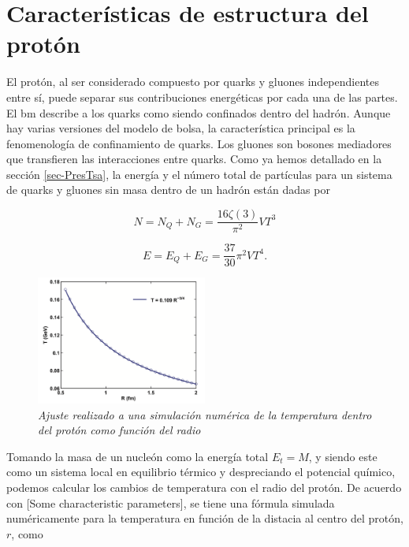 \chapter{Características de estructura del protón}\label{ch-ProtonStructureCh}

El protón, al ser considerado compuesto por quarks y gluones independientes entre sí, puede separar sus contribuciones energéticas por cada una de las partes. El \acrshort{bm} describe a los quarks como siendo confinados dentro del hadrón. Aunque hay varias versiones del modelo de bolsa, la característica principal es la fenomenología de confinamiento de quarks. Los gluones son bosones mediadores que transfieren las interacciones entre quarks. Como ya hemos detallado en la sección \ref{sec-PresTsa}, la energía y el número total de partículas para un sistema de quarks y gluones sin masa dentro de un hadrón están dadas por

\begin{equation}
N ={N}_{Q} + {N}_{G}  = \frac{16 \zeta(3)}{{\pi}^{2}}V{T}^{3}
\end{equation}

\begin{equation}
E = {E}_{Q} + {E}_{G} = \frac{37}{30} {\pi}^{2} V{T}^{4}.
\end{equation}


\begin{figure}
\centering
\includegraphics[width=0.5\textwidth]{./Images/T(R).png}
\caption[Temperatura como función del radio del protón]{\emph{Ajuste realizado a una simulación numérica de la temperatura dentro del protón como función del radio}}
\label{fig: T(r)}
\end{figure}

Tomando la masa de un nucleón como la energía total ${E}_{t} = M$, y siendo este como un sistema local en equilibrio térmico y despreciando el potencial químico, podemos calcular los cambios de temperatura con el radio del protón. De acuerdo con [Some characteristic parameters], se tiene una fórmula simulada numéricamente para la temperatura en función de la distacia al centro del protón, $r$, como 

